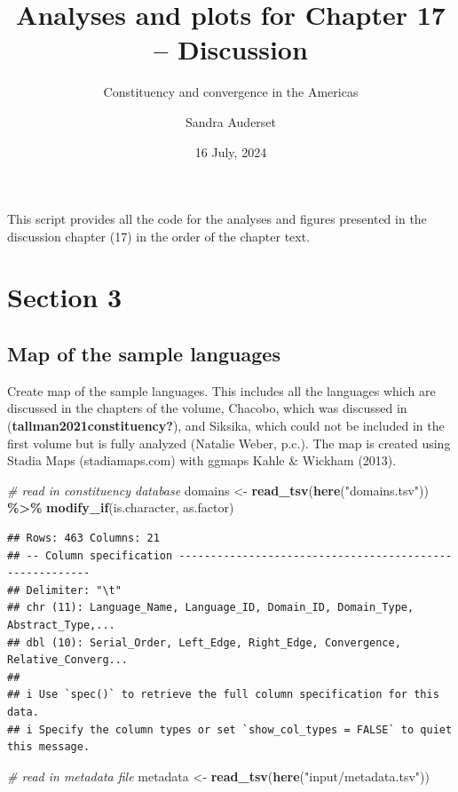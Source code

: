 \documentclass[
]{article}
\title{Analyses and plots for Chapter 17 -- Discussion}
\subtitle{Constituency and convergence in the Americas}
\author{Sandra Auderset}
\date{16 July, 2024}
\newenvironment{Shaded}{\begin{snugshade}}{\end{snugshade}}
\newcommand{\CommentTok}[1]{\textcolor[rgb]{0.56,0.35,0.01}{\textit{#1}}}
\newcommand{\FunctionTok}[1]{\textcolor[rgb]{0.13,0.29,0.53}{\textbf{#1}}}
\newcommand{\NormalTok}[1]{#1}
\newcommand{\OtherTok}[1]{\textcolor[rgb]{0.56,0.35,0.01}{#1}}
\newcommand{\SpecialCharTok}[1]{\textcolor[rgb]{0.81,0.36,0.00}{\textbf{#1}}}
\newcommand{\StringTok}[1]{\textcolor[rgb]{0.31,0.60,0.02}{#1}}
\begin{document}
\maketitle

{
\setcounter{tocdepth}{2}
\tableofcontents
}
This script provides all the code for the analyses and figures presented
in the discussion chapter (17) in the order of the chapter text.

\section{Section 3}\label{section-3}

\subsection{Map of the sample
languages}\label{map-of-the-sample-languages}

Create map of the sample languages. This includes all the languages
which are discussed in the chapters of the volume, Chacobo, which was
discussed in (\textbf{tallman2021constituency?}), and Siksika, which
could not be included in the first volume but is fully analyzed (Natalie
Weber, p.c.). The map is created using Stadia Maps (stadiamaps.com) with
ggmaps Kahle \& Wickham (2013).

\begin{Shaded}
\begin{Highlighting}[]
\CommentTok{\# read in constituency database}
\NormalTok{domains }\OtherTok{\textless{}{-}} \FunctionTok{read\_tsv}\NormalTok{(}\FunctionTok{here}\NormalTok{(}\StringTok{"domains.tsv"}\NormalTok{)) }\SpecialCharTok{\%\textgreater{}\%}
  \FunctionTok{modify\_if}\NormalTok{(is.character, as.factor)}
\end{Highlighting}
\end{Shaded}

\begin{verbatim}
## Rows: 463 Columns: 21
## -- Column specification --------------------------------------------------------
## Delimiter: "\t"
## chr (11): Language_Name, Language_ID, Domain_ID, Domain_Type, Abstract_Type,...
## dbl (10): Serial_Order, Left_Edge, Right_Edge, Convergence, Relative_Converg...
## 
## i Use `spec()` to retrieve the full column specification for this data.
## i Specify the column types or set `show_col_types = FALSE` to quiet this message.
\end{verbatim}

\begin{Shaded}
\begin{Highlighting}[]
\CommentTok{\# read in metadata file}
\NormalTok{metadata }\OtherTok{\textless{}{-}} \FunctionTok{read\_tsv}\NormalTok{(}\FunctionTok{here}\NormalTok{(}\StringTok{"input/metadata.tsv"}\NormalTok{))}
\end{Highlighting}
\end{Shaded}
\end{document}
